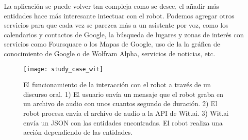La aplicación se puede volver tan compleja como se desee,
el añadir más entidades hace más interesante intectuar con el
robot. Podemos agregar otros servicios para
que cada vez se parezca más a un asistente por voz,
como los calendarios y contactos de Google, la búsqueda de lugares y
zonas de interés con servicios como Foursquare o los Mapas de Google,
uso de la la gráfica de conocimiento de Google o de Wolfram Alpha, 
servicios de noticias, etc.

\begin{figure}[htbp]
\centering
\caption{El funcionamiento de la interacción con el robot a través de un discurso
oral. 1) El usuario envía un mensaje que el robot graba en un archivo de audio
con unos cuantos segundo de duración. 2) El robot procesa envía el archivo de audio
a la API de Wit.ai. 3) Wit.ai envía un JSON con las entidades encontradas. El robot realiza una acción dependiendo de las entidades.}
\texttt{[image: study\_case\_wit]}
\end{figure}

